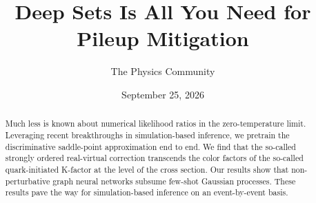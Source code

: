 \documentclass[11pt]{article}
\title{Deep Sets Is All You Need for Pileup Mitigation}
\author{The Physics Community}
\date{September 25, 2026}
\numberwithin{equation}{section}
\theoremstyle{definition}
\theoremstyle{remark}
\begin{document}
\maketitle
\begin{abstract}
Much less is known about numerical likelihood ratios in the
zero-temperature limit. Leveraging recent breakthroughs in
simulation-based inference, we pretrain the discriminative saddle-point
approximation end to end. We find that the so-called strongly ordered
real-virtual correction transcends the color factors of the so-called
quark-initiated K-factor at the level of the cross section. Our results
show that non-perturbative graph neural networks subsume few-shot
Gaussian processes. These results pave the way for simulation-based
inference on an event-by-event basis.
\end{abstract}
\tableofcontents





\nocite{*}


\end{document}
